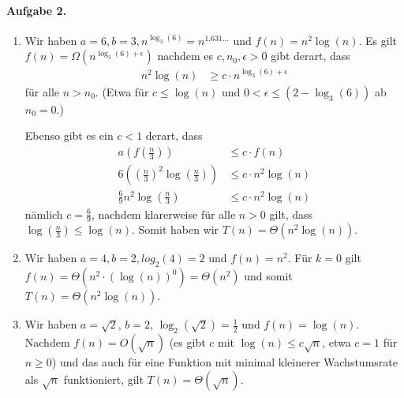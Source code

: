 \documentclass{article}
\begin{document}
\pagebreak
\paragraph{Aufgabe 2.}

\begin{enumerate}
    \item Wir haben $a = 6, b = 3, n^{\log_{3}(6)} = n^{1.631\ldots}$ und $f(n) = n^2 \log(n)$. Es gilt $f(n) = \Omega(n^{\log_{3}(6) + \epsilon})$ nachdem es $c, n_0, \epsilon > 0$ gibt derart, dass
    \begin{align*}
        n^2 \log(n) &\geq c \cdot n^{\log_{3}(6) + \epsilon}
    \end{align*}
    für alle $n > n_0$. (Etwa f\"ur $c \leq \log(n)$ und $0 < \epsilon \leq (2 - \log_{3}(6))$ ab $n_0 = 0$.)
 
    Ebenso gibt es ein $c < 1$ derart, dass
    \begin{align*}
        a\left(f\left(\frac{n}{3}\right)\right) &\leq c \cdot f(n) \\
        6\left(\left(\frac{n}{3}\right)^2 \log(\frac{n}{3})\right) &\leq c \cdot n^2 \log(n) \\
        \frac{6}{9}n^2 \log(\frac{n}{3}) &\leq c \cdot n^2 \log(n)
    \end{align*}
    nämlich $c = \frac{6}{9}$, nachdem klarerweise für alle $n > 0$ gilt, dass $\log(\frac{n}{3}) \leq \log(n)$. Somit haben wir $T(n) = \Theta(n^2 \log(n))$.

    \item Wir haben $a = 4, b = 2, log_2(4) = 2$ und $f(n) = n^2$. F\"ur $k = 0$ gilt $f(n) = \Theta(n^2 \cdot (\log(n))^0) = \Theta(n^2)$ und somit $T(n) = \Theta(n^2 \log(n))$.
    
    \item Wir haben $a = \sqrt{2}$, $b = 2$, $\log_2(\sqrt{2}) = \frac{1}{2}$ und $f(n) = \log(n)$. Nachdem $f(n) = O(\sqrt{n})$ (es gibt $c$ mit $\log(n) \leq c\sqrt{n}$, etwa $c = 1$ f\"ur $n \geq 0$) und das auch f\"ur eine Funktion mit minimal kleinerer Wachstumsrate als $\sqrt{n}$ funktioniert, gilt $T(n) = \Theta(\sqrt{n})$.
\end{enumerate}
\end{document}
